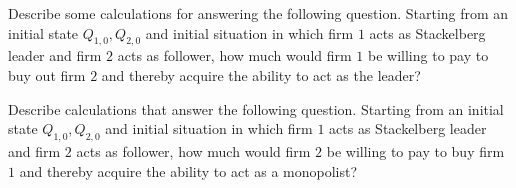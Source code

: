\medskip
{}  Describe some calculations for answering the following question.  Starting from an initial state $Q_{1,0}, Q_{2,0}$ and initial situation in which
firm $1$ acts as Stackelberg leader and firm $2$ acts as follower, how much would firm $1$ be willing to pay to buy out firm $2$ and thereby acquire the ability to act as
the leader?


\medskip
{}  Describe calculations that answer the following question.  Starting from an initial state $Q_{1,0}, Q_{2,0}$ and initial situation in which
firm $1$ acts as Stackelberg leader and firm $2$ acts as follower, how much would firm $2$ be willing to pay to buy  firm $1$ and thereby acquire the ability to act as
a monopolist?





%
%
%
%
%


\eqnotracefalse

